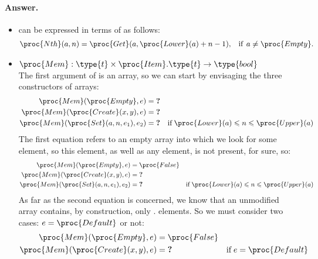 \paragraph{Answer.} 

\begin{itemize}

  \item {} can be expressed in terms of  as follows:
    \begin{align*}
         \proc{Nth} (a, n) 
      &= \proc{Get} (a,\proc{Lower}(a)+n-1),
      &\text{if} \,\; a \neq \proc{Empty}.
    \end{align*}

  \item \(\proc{Mem} : \type{t} \times \proc{Item}.\type{t} 
    \rightarrow \type{bool}\)\\
    The first argument of  is an array, so we can start by
    envisaging the three constructors of arrays:
    \begin{align*}
        \proc{Mem} (\proc{Empty}, e)
     &= \textbf{?}\\
        \proc{Mem} (\proc{Create} (x, y), e)
     &= \textbf{?}\\
        \proc{Mem} (\proc{Set} (a, n, e_1), e_2)
     &= \textbf{?}
     & \text{if} \; \proc{Lower} (a) \leqslant n \leqslant
     \proc{Upper} (a)
    \end{align*}
    The first equation refers to an empty array into which we look for
    some element, so this element, as well as any element, is not
    present, for sure, so:
    \begin{align*}
        \proc{Mem} (\proc{Empty}, e)
     &= \proc{False}\\
        \proc{Mem} (\proc{Create} (x, y), e)
     &= \textbf{?}\\
        \proc{Mem} (\proc{Set} (a, n, e_1), e_2)
     &= \textbf{?}
     & \text{if} \; \proc{Lower} (a) \leqslant n \leqslant
     \proc{Upper} (a)
    \end{align*}
    As far as the second equation is concerned, we know that an
    unmodified array contains, by construction, only
    . elements. So we must consider two
    cases: \(e = \proc{Default}\) or not:
    \begin{align*}
        \proc{Mem} (\proc{Empty}, e)
     &= \proc{False}\\
        \proc{Mem} (\proc{Create} (x, y), e)
     &= \textbf{?}
     & \text{if} \; e = \proc{Default}\\

\end{align*}
\end{itemize}
